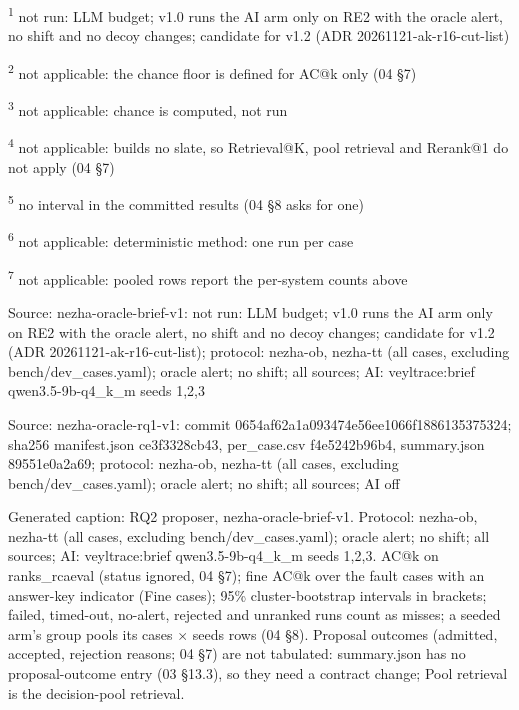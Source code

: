 \par\raggedright\noindent
\textsuperscript{1} not run: LLM budget; v1.0 runs the AI arm only on RE2 with the oracle alert, no shift and no decoy changes; candidate for v1.2 (ADR 20261121-ak-r16-cut-list)\par
\textsuperscript{2} not applicable: the chance floor is defined for AC@k only (04 \S{}7)\par
\textsuperscript{3} not applicable: chance is computed, not run\par
\textsuperscript{4} not applicable: builds no slate, so Retrieval@K, pool retrieval and Rerank@1 do not apply (04 \S{}7)\par
\textsuperscript{5} no interval in the committed results (04 \S{}8 asks for one)\par
\textsuperscript{6} not applicable: deterministic method: one run per case\par
\textsuperscript{7} not applicable: pooled rows report the per-system counts above\par
\noindent Source: nezha-oracle-brief-v1: not run: LLM budget; v1.0 runs the AI arm only on RE2 with the oracle alert, no shift and no decoy changes; candidate for v1.2 (ADR 20261121-ak-r16-cut-list); protocol: nezha-ob, nezha-tt (all cases, excluding bench/\allowbreak{}dev\_cases.yaml); oracle alert; no shift; all sources; AI: veyltrace:brief qwen3.5-9b-q4\_k\_m seeds 1,2,3\par
\noindent Source: nezha-oracle-rq1-v1: commit 0654af62a1a093474e56ee1066f1886135375324; sha256 manifest.json ce3f3328cb43, per\_case.csv f4e5242b96b4, summary.json 89551e0a2a69; protocol: nezha-ob, nezha-tt (all cases, excluding bench/\allowbreak{}dev\_cases.yaml); oracle alert; no shift; all sources; AI off\par
\noindent Generated caption: RQ2 proposer, nezha-oracle-brief-v1. Protocol: nezha-ob, nezha-tt (all cases, excluding bench/\allowbreak{}dev\_cases.yaml); oracle alert; no shift; all sources; AI: veyltrace:brief qwen3.5-9b-q4\_k\_m seeds 1,2,3. AC@k on ranks\_rcaeval (status ignored, 04 \S{}7); fine AC@k over the fault cases with an answer-key indicator (Fine cases); 95\% cluster-bootstrap intervals in brackets; failed, timed-out, no-alert, rejected and unranked runs count as misses; a seeded arm's group pools its cases $\times$ seeds rows (04 \S{}8). Proposal outcomes (admitted, accepted, rejection reasons; 04 \S{}7) are not tabulated: summary.json has no proposal-outcome entry (03 \S{}13.3), so they need a contract change; Pool retrieval is the decision-pool retrieval.\par
\endgroup
